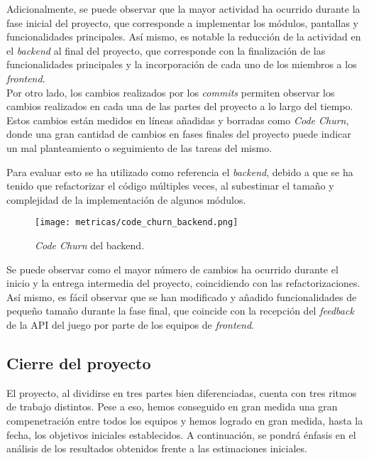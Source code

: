 \documentclass[11pt, a4paper, titlepage]{article}
\begin{document}
Adicionalmente, se puede observar que la mayor actividad ha ocurrido durante la fase inicial del proyecto, que corresponde a implementar los módulos, pantallas y funcionalidades principales. Así mismo, es notable la reducción de la actividad en el \textit{backend} al final del proyecto, que corresponde con la finalización de las funcionalidades principales y la incorporación de cada uno de los miembros a los \textit{frontend}.\\

Por otro lado, los cambios realizados por los \textit{commits} permiten observar los cambios realizados en cada una de las partes del proyecto a lo largo del tiempo. Estos cambios están medidos en líneas añadidas y borradas como \textit{Code Churn}, donde una gran cantidad de cambios en fases finales del proyecto puede indicar un mal planteamiento o seguimiento de las tareas del mismo. 

Para evaluar esto se ha utilizado como referencia el \textit{backend}, debido a que se ha tenido que refactorizar el código múltiples veces, al subestimar el tamaño y complejidad de la implementación de algunos módulos.

\begin{figure}[!h]
    \centering
    \texttt{[image: metricas/code\_churn\_backend.png]}
    \caption{\textit{Code Churn} del backend.}
    \label{fig:my_label}
\end{figure}
\FloatBarrier

Se puede observar como el mayor número de cambios ha ocurrido durante el inicio y la entrega intermedia del proyecto, coincidiendo con las refactorizaciones. Así mismo, es fácil observar que se han modificado y añadido funcionalidades de pequeño tamaño durante la fase final, que coincide con la recepción del \textit{feedback} de la API del juego por parte de los equipos de \textit{frontend}.

\subsection{Cierre del proyecto}

El proyecto, al dividirse en tres partes bien diferenciadas, cuenta con tres ritmos de trabajo distintos. Pese a eso, hemos conseguido en gran medida una gran compenetración entre todos los equipos y hemos logrado en gran medida, hasta la fecha, los objetivos iniciales establecidos. A continuación, se pondrá énfasis en el análisis de los resultados obtenidos frente a las estimaciones iniciales. \\
\end{document}
